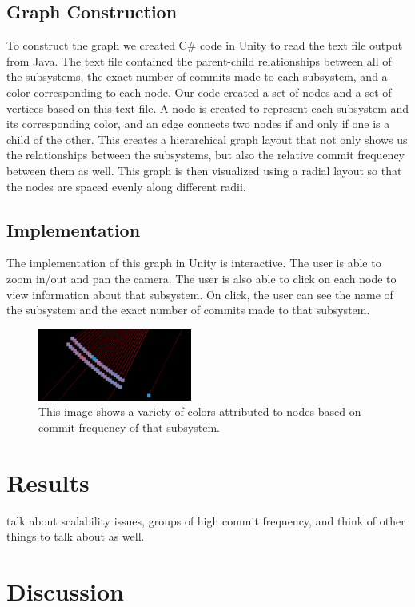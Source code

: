 \documentclass[conference]{IEEEtran}
\begin{document}
\subsection{Graph Construction}
To construct the graph we created C\# code in Unity to read the text file output from Java. The text file contained the parent-child relationships between all of the subsystems, the exact number of commits made to each subsystem, and a color corresponding to each node. Our code created a set of nodes and a set of vertices based on this text file. A node is created to represent each subsystem and its corresponding color, and an edge connects two nodes if and only if one is a child of the other. This creates a hierarchical graph layout that not only shows us the relationships between the subsystems, but also the relative commit frequency between them as well. This graph is then visualized using a radial layout so that the nodes are spaced evenly along different radii.

\subsection{Implementation}
The implementation of this graph in Unity is interactive. The user is able to zoom in/out and pan the camera. The user is also able to click on each node to view information about that subsystem. On click, the user can see the name of the subsystem and the exact number of commits made to that subsystem. 

\begin{figure}[h!]
	\centering
	\includegraphics[width=0.45\textwidth]{randomSection.png}
	\caption{This image shows a variety of colors attributed to nodes based on commit frequency of that subsystem.}
\end{figure}

\section{Results}

talk about scalability issues, groups of high commit frequency, and think of other things to talk about as well.

\section{Discussion}
\end{document}
